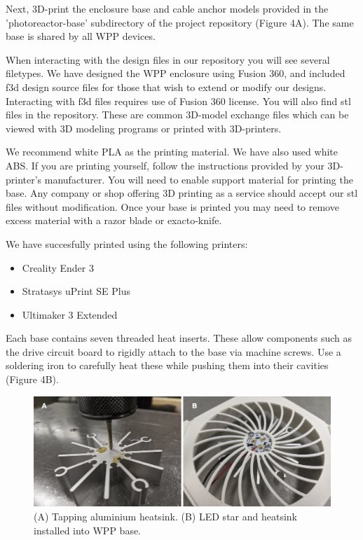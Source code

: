 \documentclass[11pt]{article}
\begin{document}
Next, 3D-print the enclosure base and cable anchor models provided in the 'photoreactor-base' subdirectory of the project repository (Figure 4A).
The same base is shared by all WPP devices.

When interacting with the design files in our repository you will see several filetypes.
We have designed the WPP enclosure using Fusion 360, and included f3d design source files for those that wish to extend or modify our designs.
Interacting with f3d files requires use of Fusion 360 license.
You will also find stl files in the repository.
These are common 3D-model exchange files which can be viewed with 3D modeling programs or printed with 3D-printers. 

\clearpage

We recommend white PLA as the printing material. We have also used white ABS.
If you are printing yourself, follow the instructions provided by your 3D-printer's manufacturer.
You will need to enable support material for printing the base.
Any company or shop offering 3D printing as a service should accept our stl files without modification.
Once your base is printed you may need to remove excess material with a razor blade or exacto-knife.

We have succesfully printed using the following printers:

\begin{itemize}
	\item Creality Ender 3
	\item Stratasys uPrint SE Plus
	\item Ultimaker 3 Extended
\end{itemize}

Each base contains seven threaded heat inserts.
These allow components such as the drive circuit board to rigidly attach to the base via machine screws.
Use a soldering iron to carefully heat these while pushing them into their cavities (Figure 4B).

\begin{figure}[H]
	\includegraphics[width=\textwidth]{"./fig5.png"}
	\caption{(A) Tapping aluminium heatsink. (B) LED star and heatsink installed into WPP base.}
\end{figure}
\end{document}
